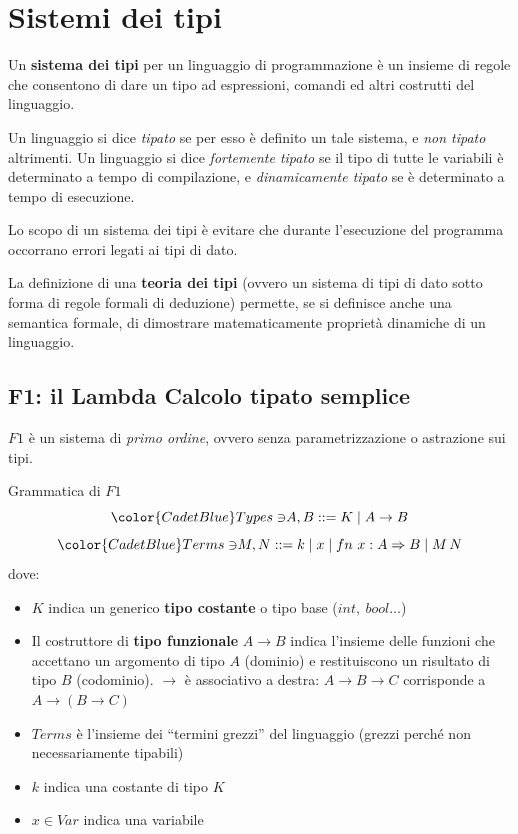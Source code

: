 \documentclass[a4paper,11pt]{report}
\begin{document}
\chapter{Sistemi dei tipi}
Un \textbf{sistema dei tipi} per un linguaggio di programmazione è un insieme di regole che consentono di dare un tipo ad espressioni, comandi ed altri costrutti del linguaggio.

Un linguaggio si dice \textit{tipato} se per esso è definito un tale sistema, e \textit{non tipato} altrimenti. Un linguaggio si dice \textit{fortemente tipato} se il tipo di tutte le variabili è determinato a tempo di compilazione, e \textit{dinamicamente tipato} se è determinato a tempo di esecuzione.

Lo scopo di un sistema dei tipi è evitare che durante l'esecuzione del programma occorrano errori legati ai tipi di dato.

La definizione di una \textbf{teoria dei tipi} (ovvero un sistema di tipi di dato sotto forma di regole formali di deduzione) permette, se si definisce anche una semantica formale, di dimostrare matematicamente proprietà dinamiche di un linguaggio.

\section{F1: il Lambda Calcolo tipato semplice}
\( F1 \) è un sistema di \textit{primo ordine}, ovvero senza parametrizzazione o astrazione sui tipi.

\begin{defframe}{Grammatica di \( F1 \)}{}
    \[ {\color{CadetBlue}Types \ni} A, B ::= K \mid A\to B \]
    \[ {\color{CadetBlue}Terms \ni} M, N  ::= k \mid x \mid fn \ x: A \Rightarrow B \mid M \, N\]
    dove:
    \begin{itemize}
        \item \( K \) indica un generico \textbf{tipo costante} o tipo base (\( int, \ bool\dots \))
        \item Il costruttore di \textbf{tipo funzionale} \( A \to B \) indica l'insieme delle funzioni che accettano un argomento di tipo \( A \) (dominio) e restituiscono un risultato di tipo \( B \) (codominio).    
    \subitem\( \to \) è associativo a destra: \( A \to B \to C \) corrisponde a \(A\to (B \to C) \)
        \item  \( Terms \) è l'insieme dei ``termini grezzi'' del linguaggio (grezzi perché non necessariamente tipabili)
        \item \( k \) indica una costante di tipo \( K \)
        \item \( x \in Var\) indica una variabile

\end{itemize}

\end{defframe}
\end{document}

